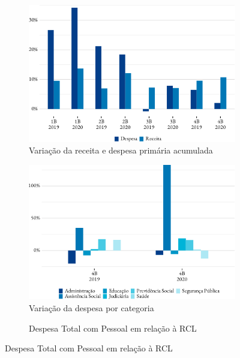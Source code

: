 \begin{figure}[!h]
	\begin{subfigure}{\linewidth}
		\caption{\label{fig:var_receita_despesa_primaria}Variação da receita e despesa primária acumulada}
		\includegraphics{fig/var_receita_despesa_primaria-1.pdf}
	\end{subfigure}
	\begin{subfigure}{\linewidth}
		\caption{\label{fig:var_despesa_categoria}Variação da despesa por categoria}
		\includegraphics{fig/var_despesa_categoria-1.pdf}
	\end{subfigure}
	\begin{subfigure}{\linewidth}
		\caption{\label{fig:desp_pessoal_rcl}Despesa Total com Pessoal em relação à RCL}

\end{subfigure}
\end{figure}

